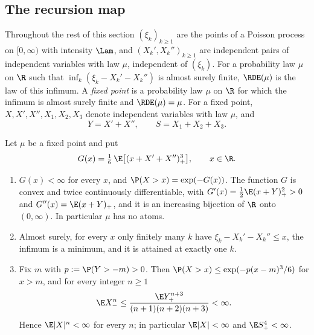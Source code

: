 \subsection{The recursion map}\label{subsec:tree-rde}

Throughout the rest of this section $(\xi_k)_{k\ge1}$ are the points of a Poisson process on
$[0,\infty)$ with intensity $\Lam$, and $(X_k',X_k'')_{k\ge1}$ are independent pairs of
independent variables with law $\mu$, independent of $(\xi_k)$. For a probability law $\mu$ on
$\R$ such that $\inf_k(\xi_k-X_k'-X_k'')$ is almost surely finite, $\RDE(\mu)$ is the law of
this infimum. A \emph{fixed point} is a probability law $\mu$ on $\R$ for which the infimum is
almost surely finite and $\RDE(\mu)=\mu$. For a fixed point, $X,X',X'',X_1,X_2,X_3$ denote
independent variables with law $\mu$, and
\[
  Y=X'+X'',\qquad S=X_1+X_2+X_3 .
\]

\begin{lemma}\label{lem:tree-G}
Let $\mu$ be a fixed point and put
\begin{equation}\label{eq:tree-G}
  G(x)=\tfrac16\,\E\bigl[(x+X'+X'')_+^3\bigr],\qquad x\in\R .
\end{equation}
\begin{enumerate}
\item[(i)] $G(x)<\infty$ for every $x$, and $\P(X>x)=\exp(-G(x))$. The function $G$ is convex
and twice continuously differentiable, with $G'(x)=\tfrac12\E(x+Y)_+^2>0$ and
$G''(x)=\E(x+Y)_+$, and it is an increasing bijection of $\R$ onto $(0,\infty)$. In particular
$\mu$ has no atoms.
\item[(ii)] Almost surely, for every $x$ only finitely many $k$ have $\xi_k-X_k'-X_k''\le x$,
the infimum is a minimum, and it is attained at exactly one $k$.
\item[(iii)] Fix $m$ with $p:=\P(Y>-m)>0$. Then $\P(X>x)\le\exp(-p(x-m)^3/6)$ for $x>m$, and
for every integer $n\ge1$
\[
  \E X_-^n\le\frac{\E Y_+^{n+3}}{(n+1)(n+2)(n+3)}<\infty .
\]
Hence $\E|X|^n<\infty$ for every $n$; in particular $\E|X|<\infty$ and $\E S_+^4<\infty$.
\end{enumerate}
\end{lemma}

